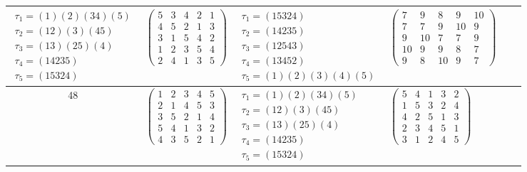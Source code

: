 \begin{longtable}{|c|p{2.7cm}|p{2.7cm}|p{2.7cm}|p{2.7cm}|p{3.3cm}|}
    $\begin{array}{l}\tau_{1}=(1)(2)(34)(5)\\ \tau_{2}=(12)(3)(45)\\ \tau_{3}=(13)(25)(4)\\ \tau_{4}=(14235)\\ \tau_{5}=(15324)\end{array}$     &
    $\begin{pmatrix}5&3&4&2&1\\4&5&2&1&3\\3&1&5&4&2\\1&2&3&5&4\\2&4&1&3&5\end{pmatrix}$                                                         &
    $\begin{array}{l}\tau_{1}=(15324)\\ \tau_{2}=(14235)\\ \tau_{3}=(12543)\\ \tau_{4}=(13452)\\ \tau_{5}=(1)(2)(3)(4)(5)\end{array}$           &
    $\begin{pmatrix}7&9&8&9&10\\7&7&9&10&9\\9&10&7&7&9\\10&9&9&8&7\\9&8&10&9&7\end{pmatrix}$                                                                                                                                \\
    \hline
    48                                                                                                                                          &
    $\begin{pmatrix}1&2&3&4&5\\2&1&4&5&3\\3&5&2&1&4\\5&4&1&3&2\\4&3&5&2&1\end{pmatrix}$                                                         &
    $\begin{array}{l}\tau_{1}=(1)(2)(34)(5)\\ \tau_{2}=(12)(3)(45)\\ \tau_{3}=(13)(25)(4)\\ \tau_{4}=(14235)\\ \tau_{5}=(15324)\end{array}$     &
    $\begin{pmatrix}5&4&1&3&2\\1&5&3&2&4\\4&2&5&1&3\\2&3&4&5&1\\3&1&2&4&5\end{pmatrix}$                                                         &

\end{longtable}

